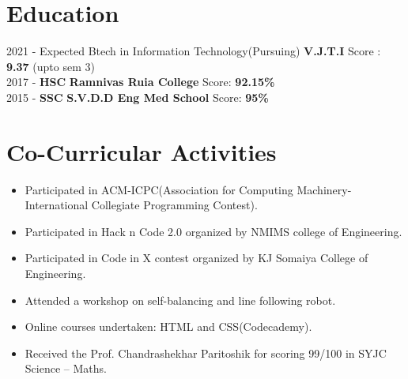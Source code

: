 \documentclass[letterpaper]{twentysecondcv} %
\begin{document}
\makeprofile %
 

\section{Education}

\begin{twenty} %
\twentyitem
    	{2021 -}
		{Expected}
        {Btech in Information Technology(Pursuing)}
        {{\textbf{V.J.T.I}}}
        {}
        { Score : \textbf{9.37} (upto sem 3)}
        \\
	\twentyitem
    	{2017 -}
    	{}
        {\textbf{HSC}}
        {{\textbf{Ramnivas Ruia College}}}
        {}
        {
        { Score: \textbf{92.15\%}}
        }
    \\   
    \twentyitem
   		{2015 -}
		{}
        {\textbf{SSC}}
        {{\textbf{S.V.D.D Eng Med School}}}
        {}
        {
        { Score: \textbf{95\%}}
        }
     \\
     
\end{twenty}

\section{Co-Curricular Activities}
\begin{itemize}
    \item Participated in ACM-ICPC(Association for Computing Machinery-International Collegiate Programming Contest).
    \item Participated in Hack n Code 2.0 organized by NMIMS college of Engineering.
    \item Participated in Code in X contest organized by KJ Somaiya College of Engineering.
    \item Attended a workshop on self-balancing and line following robot.
    \item Online courses undertaken: HTML and CSS(Codecademy). 
    \item Received the Prof. Chandrashekhar Paritoshik for scoring 99/100 in SYJC Science – Maths.\\
\end{itemize}
\end{document}
